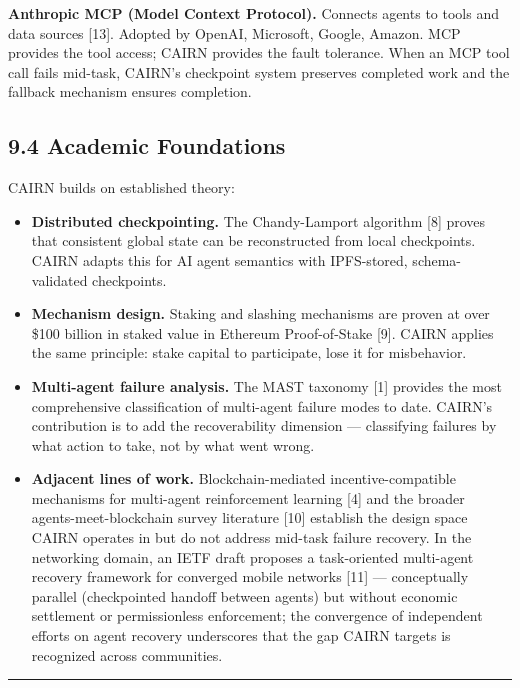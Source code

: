\documentclass[
  10pt,
]{article}
\begin{document}
\textbf{Anthropic MCP (Model Context Protocol).} Connects agents to
tools and data sources {[}13{]}. Adopted by OpenAI, Microsoft, Google,
Amazon. MCP provides the tool access; CAIRN provides the fault
tolerance. When an MCP tool call fails mid-task, CAIRN's checkpoint
system preserves completed work and the fallback mechanism ensures
completion.

\hypertarget{academic-foundations}{%
\subsection{9.4 Academic Foundations}\label{academic-foundations}}

CAIRN builds on established theory:

\begin{itemize}
\item
  \textbf{Distributed checkpointing.} The Chandy-Lamport algorithm
  {[}8{]} proves that consistent global state can be reconstructed from
  local checkpoints. CAIRN adapts this for AI agent semantics with
  IPFS-stored, schema-validated checkpoints.
\item
  \textbf{Mechanism design.} Staking and slashing mechanisms are proven
  at over \$100 billion in staked value in Ethereum Proof-of-Stake
  {[}9{]}. CAIRN applies the same principle: stake capital to
  participate, lose it for misbehavior.
\item
  \textbf{Multi-agent failure analysis.} The MAST taxonomy {[}1{]}
  provides the most comprehensive classification of multi-agent failure
  modes to date. CAIRN's contribution is to add the recoverability
  dimension --- classifying failures by what action to take, not by what
  went wrong.
\item
  \textbf{Adjacent lines of work.} Blockchain-mediated
  incentive-compatible mechanisms for multi-agent reinforcement learning
  {[}4{]} and the broader agents-meet-blockchain survey literature
  {[}10{]} establish the design space CAIRN operates in but do not
  address mid-task failure recovery. In the networking domain, an IETF
  draft proposes a task-oriented multi-agent recovery framework for
  converged mobile networks {[}11{]} --- conceptually parallel
  (checkpointed handoff between agents) but without economic settlement
  or permissionless enforcement; the convergence of independent efforts
  on agent recovery underscores that the gap CAIRN targets is recognized
  across communities.
\end{itemize}

\begin{center}\rule{0.5\linewidth}{0.5pt}\end{center}
\end{document}
